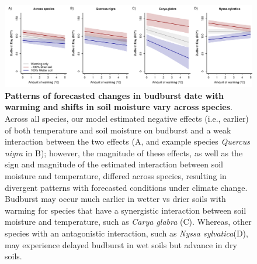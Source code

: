 \documentclass{article}
\begin{document}
 \begin{figure}[h]
\centering
 \includegraphics{../../Analyses/soilmoisture/figures/tempforecast_bb_0_5_135_28_105_4_degwarm.pdf}
 
 \caption{\textbf{Patterns of forecasted changes in budburst date with warming and shifts in soil moisture vary across species}. Across all species, our model estimated negative effects (i.e., earlier) of both temperature and soil moisture on budburst and a weak interaction between the two effects (A, and example species \textit{Quercus nigra} in B); however, the magnitude of these effects, as well as the sign and magnitude of the estimated interaction between soil moisture and temperature, differed across species, resulting in divergent patterns with forecasted conditions under climate change. Budburst may occur much earlier in wetter vs drier soils with warming for species that have a synergistic interaction between soil moisture and temperature, such as \textit{Carya glabra} (C). Whereas, other species with an antagonistic interaction, such as \textit{Nyssa sylvatica}(D), may experience delayed budburst in wet soils but advance in dry soils.}
 \label{fig:bbsp}
 \end{figure}

\end{document}

